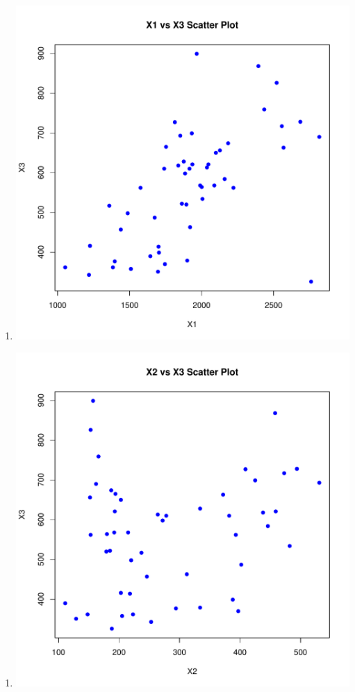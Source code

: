\documentclass[12pt,letterpaper]{article}
\begin{document}
\begin{itemize}
		  
		\begin{enumerate}
			\item[]
			\includegraphics[width=.85\textwidth]{plot.X1.X3_YuFan.pdf}
		\end{enumerate} 
		
		  
		\begin{enumerate}
			\item[]
			\includegraphics[width=.85\textwidth]{plot.X2.X3_YuFan.pdf}
		\end{enumerate} 
		

\end{itemize}
\end{document}

